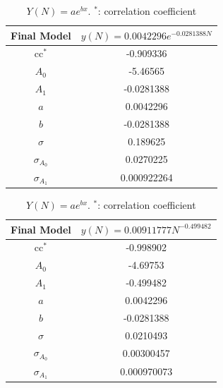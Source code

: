 \documentclass[10pt,a4paper]{article}
\begin{document}
\begin{table}[H]
\begin{minipage}[b]{0.5\linewidth}\centering
\begin{tabular}{|c|c|}
\hline
Final Model&$y(N) = 0.0042296e^{-0.0281388N}$\\
\hline
cc$^*$&-0.909336\\
$A_0$&-5.46565\\
$A_1$&-0.0281388\\
$a$&0.0042296\\
$b$&-0.0281388\\
$\sigma$&0.189625\\
$\sigma_{A_0}$&0.0270225\\
$\sigma_{A_1}$&0.000922264\\
\hline
\end{tabular}
\caption{$Y(N)=a e^{bx}$. $^*$: correlation coefficient}
\end{minipage}
\hspace{0.5cm}
\begin{minipage}[b]{0.5\linewidth}\centering
\begin{tabular}{|c|c|}
\hline
Final Model&$y(N) = 0.00911777N^{-0.499482}$\\
\hline
cc$^*$&-0.998902\\
$A_0$&-4.69753\\
$A_1$&-0.499482\\
$a$&0.0042296\\
$b$&-0.0281388\\
$\sigma$&0.0210493\\
$\sigma_{A_0}$&0.00300457\\
$\sigma_{A_1}$&0.000970073\\
\hline
\end{tabular}
\caption{$Y(N)=a e^{bx}$. $^*$: correlation coefficient}
\end{minipage}
\end{table}
\end{document}

